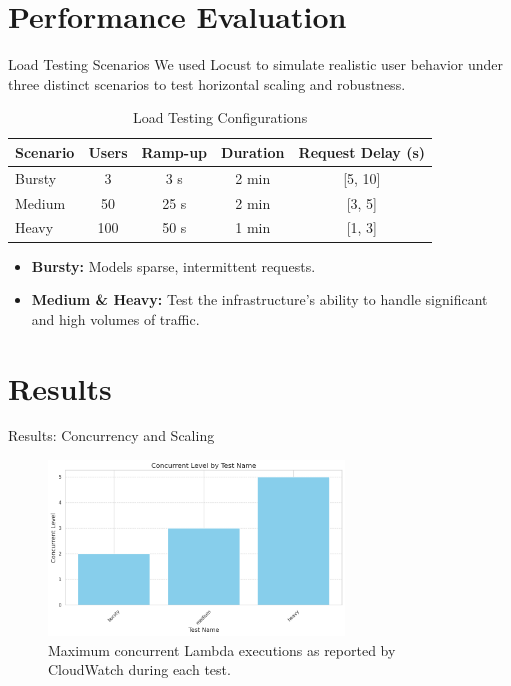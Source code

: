 \documentclass{beamer}
\begin{document}
\section{Performance Evaluation}
\begin{frame}{Load Testing Scenarios}
    We used Locust to simulate realistic user behavior under three distinct scenarios to test horizontal scaling and robustness.
    
    \begin{table}[H]
        \centering
        \caption{Load Testing Configurations }
        \begin{tabular}{lcccc}
            \toprule
            \textbf{Scenario} & \textbf{Users} & \textbf{Ramp-up} & \textbf{Duration} & \textbf{Request Delay (s)} \\
            \midrule
            Bursty & 3 & 3 s & 2 min & [5, 10] \\
            Medium & 50 & 25 s & 2 min & [3, 5] \\
            Heavy & 100 & 50 s & 1 min & [1, 3] \\
            \bottomrule
        \end{tabular}
    \end{table}
    
    \vspace{1em}
    
    \begin{itemize}
        \item \textbf{Bursty:} Models sparse, intermittent requests.
        \item \textbf{Medium \& Heavy:} Test the infrastructure's ability to handle significant and high volumes of traffic.
    \end{itemize}
\end{frame}

\section{Results}
\begin{frame}{Results: Concurrency and Scaling}
    \begin{figure}[H]
        \centering
        \includegraphics[width=0.7\textwidth]{conc_levels.png}
        \caption{Maximum concurrent Lambda executions as reported by CloudWatch during each test.}
    \end{figure}
\end{frame}
\end{document}
